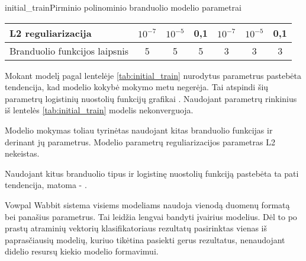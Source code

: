 \begin{ktutable}{initial_train}{Pirminio polinominio branduolio modelio parametrai}
    \begin{tabular}{| l | c | c | c | c | c | c | }
    \hline
        L2 reguliarizacija & $10^{-7}$ & $10^{-5}$ & 0,1 & $10^{-7}$ & $10^{-5}$ & 0,1 \\ \hline
        Branduolio funkcijos laipsnis & 5 & 5 & 5 & 3 & 3 & 3 \\ \hline
    \end{tabular}
\end{ktutable}

Mokant modelį pagal lentelėje \vref{tab:initial_train} nurodytus parametrus pastebėta tendencija, kad
modelio kokybė mokymo metu negerėja. Tai atspindi šių parametrų logistinių nuostolių funkcijų grafikai
. Naudojant parametrų rinkinius iš lentelės \vref{tab:initial_train}
modelis nekonverguoja.


Modelio mokymas toliau tyrinėtas naudojant kitas branduolio funkcijas ir derinant jų parametrus.
Modelio parametrų reguliarizacijos parametras L2 nekeistas.


Naudojant kitus branduolio tipus ir logistinę nuostolių funkciją pastebėta ta pati tendencija, matoma  - .


Vowpal Wabbit sistema visiems modeliams naudoja vienodą duomenų formatą bei panašius parametrus.
Tai leidžia lengvai bandyti įvairius modelius. Dėl to po prastų atraminių vektorių klasifikatoriaus rezultatų
pasirinktas vienas iš paprasčiausių modelių, kuriuo tikėtina pasiekti gerus rezultatus, nenaudojant
didelio resursų kiekio modelio formavimui.

